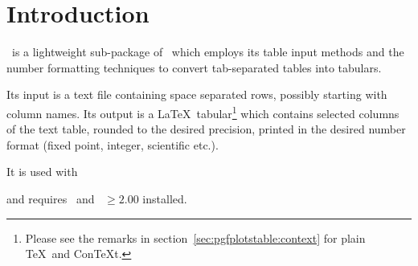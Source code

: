 \maketitle
\begin{abstract}%
	This package reads tab-separated numerical tables from input and generates code for pretty-printed \LaTeX-tabulars. It rounds to the desired precision and prints it in different number formatting styles.
\end{abstract}
\tableofcontents
\section{Introduction}
\PGFPlotstable\ is a lightweight sub-package of \PGFPlots\ which employs its table input methods and the number formatting techniques to convert tab-separated tables into tabulars.

Its input is a text file containing space separated rows, possibly starting with column names. Its output is a \LaTeX\ tabular\footnote{Please see the remarks in section~\ref{sec:pgfplotstable:context} for plain \TeX\ and Con\TeX t.} which contains selected columns of the text table, rounded to the desired precision, printed in the desired number format (fixed point, integer, scientific etc.).

It is used with
\begin{codeexample}
\usepackage{pgfplotstable}
\end{codeexample}
\noindent and requires \PGFPlots\ and \PGF\ $ \ge 2.00$ installed.

